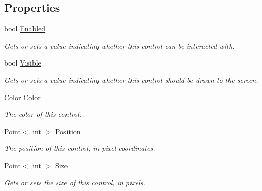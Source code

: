\subsection*{Properties}
\begin{DoxyCompactItemize}
\item 
bool \hyperlink{interface_tri_devs_1_1_tri_engine_1_1_u_i_1_1_i_control_a85e871547da23b6f0a8c5d7fe25b16dc}{Enabled}
\begin{DoxyCompactList}\small\item\em Gets or sets a value indicating whether this control can be interacted with. \end{DoxyCompactList}\item 
bool \hyperlink{interface_tri_devs_1_1_tri_engine_1_1_u_i_1_1_i_control_a2431191a8fc8b2aabf08379762a2aa64}{Visible}
\begin{DoxyCompactList}\small\item\em Gets or sets a value indicating whether this control should be drawn to the screen. \end{DoxyCompactList}\item 
\hyperlink{struct_tri_devs_1_1_tri_engine_1_1_color}{Color} \hyperlink{interface_tri_devs_1_1_tri_engine_1_1_u_i_1_1_i_control_a5a63cf497f4b624eca7736b58fe0a730}{Color}
\begin{DoxyCompactList}\small\item\em The color of this control. \end{DoxyCompactList}\item 
Point$<$ int $>$ \hyperlink{interface_tri_devs_1_1_tri_engine_1_1_u_i_1_1_i_control_a6c895318c35e72761e0d8b3a32965814}{Position}
\begin{DoxyCompactList}\small\item\em The position of this control, in pixel coordinates. \end{DoxyCompactList}\item 
Point$<$ int $>$ \hyperlink{interface_tri_devs_1_1_tri_engine_1_1_u_i_1_1_i_control_ab08f4a027d60ab8a0ba7990b2a0b5d9e}{Size}
\begin{DoxyCompactList}\small\item\em Gets or sets the size of this control, in pixels. \end{DoxyCompactList}\item 

\end{DoxyCompactItemize}
